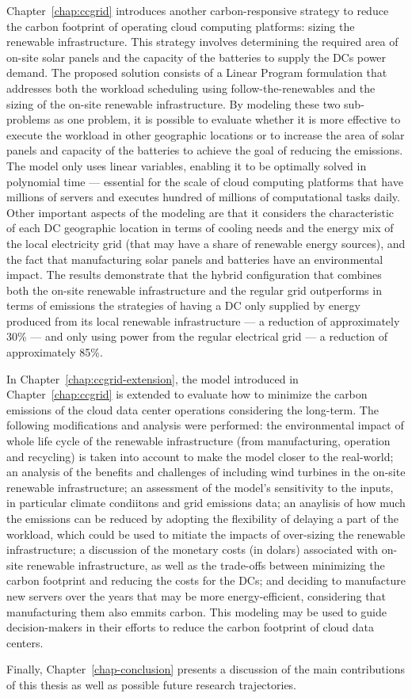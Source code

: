 Chapter~\ref{chap:ccgrid} introduces another carbon-responsive strategy to reduce the carbon footprint of operating cloud computing platforms: sizing the renewable infrastructure. This strategy involves determining the required area of on-site solar panels and the capacity of the batteries to supply the DCs power demand. The proposed solution consists of a Linear Program formulation that addresses both the workload scheduling using follow-the-renewables and the sizing of the on-site renewable infrastructure. By modeling these two sub-problems as one problem, it is possible to evaluate whether it is more effective to execute the workload in other geographic locations or to increase the area of solar panels and capacity of the batteries to achieve the goal of reducing the  emissions. The model only uses linear variables, enabling it to be optimally solved in polynomial time --- essential for the scale of cloud computing platforms that have millions of servers and executes hundred of millions of computational tasks daily. Other important aspects of the modeling are that it considers the characteristic of each DC geographic location in terms of cooling needs and the energy mix of the local electricity grid (that may have a share of renewable energy sources), and the fact that manufacturing solar panels and batteries have an environmental impact. The results demonstrate that the hybrid configuration that combines both the on-site renewable infrastructure and the regular grid outperforms in terms of  emissions the strategies of having a DC only supplied by energy produced from its local renewable infrastructure --- a reduction of approximately 30\% --- and only using power from the regular electrical grid --- a reduction of approximately 85\%.

In Chapter~\ref{chap:ccgrid-extension}, the model introduced in Chapter~\ref{chap:ccgrid} is extended to evaluate how to minimize the carbon emissions of the cloud data center operations considering the long-term. The following modifications and analysis were performed: the environmental impact of whole life cycle of the renewable infrastructure (from manufacturing, operation and recycling) is taken into account to make the model closer to the real-world; an analysis of the benefits and challenges of including wind turbines in the on-site renewable infrastructure; an assessment of the model's sensitivity to the inputs, in particular climate condiitons and grid emissions data; an anaylisis of how much the  emissions can be reduced by adopting the flexibility of delaying a part of the workload, which could be used to mitiate the impacts of over-sizing the renewable infrastructure; a discussion of the monetary costs (in dolars) associated with on-site renewable infrastructure, as well as the trade-offs between minimizing the carbon footprint and reducing the costs for the DCs; and deciding to manufacture new servers over the years that may be more energy-efficient, considering that manufacturing them also emmits carbon. This modeling may be used to guide decision-makers in their efforts to reduce the carbon footprint of cloud data centers.

Finally, Chapter~\ref{chap-conclusion} presents a discussion of the main contributions of this thesis as well as possible future research trajectories.